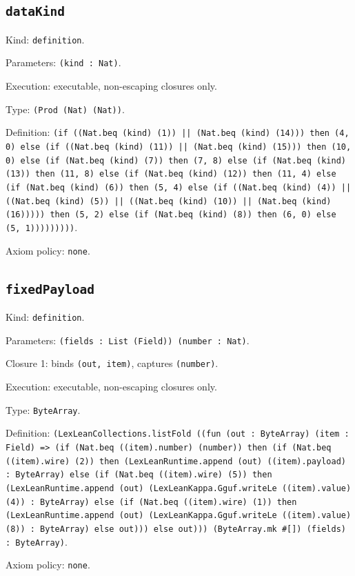 \documentclass[11pt]{article}
\begin{document}
\subsection*{\texttt{dataKind}}
\noindent Kind: \texttt{definition}.\par
\noindent Parameters: \texttt{(kind : Nat)}.\par
\noindent Execution: executable, non-escaping closures only.\par
\noindent Type: \texttt{(Prod (Nat) (Nat))}.\par
\noindent Definition: \texttt{(if ((Nat.beq (kind) (1)) || (Nat.beq (kind) (14))) then (4, 0) else (if ((Nat.beq (kind) (11)) || (Nat.beq (kind) (15))) then (10, 0) else (if (Nat.beq (kind) (7)) then (7, 8) else (if (Nat.beq (kind) (13)) then (11, 8) else (if (Nat.beq (kind) (12)) then (11, 4) else (if (Nat.beq (kind) (6)) then (5, 4) else (if ((Nat.beq (kind) (4)) || ((Nat.beq (kind) (5)) || ((Nat.beq (kind) (10)) || (Nat.beq (kind) (16))))) then (5, 2) else (if (Nat.beq (kind) (8)) then (6, 0) else (5, 1)))))))))}.\par
\noindent Axiom policy: \texttt{none}.\par
\subsection*{\texttt{fixedPayload}}
\noindent Kind: \texttt{definition}.\par
\noindent Parameters: \texttt{(fields : List (Field)) (number : Nat)}.\par
\noindent Closure 1: binds \texttt{(out, item)}, captures \texttt{(number)}.\par
\noindent Execution: executable, non-escaping closures only.\par
\noindent Type: \texttt{ByteArray}.\par
\noindent Definition: \texttt{(LexLeanCollections.listFold ((fun (out : ByteArray) (item : Field) => (if (Nat.beq ((item).number) (number)) then (if (Nat.beq ((item).wire) (2)) then (LexLeanRuntime.append (out) ((item).payload) : ByteArray) else (if (Nat.beq ((item).wire) (5)) then (LexLeanRuntime.append (out) (LexLeanKappa.Gguf.writeLe ((item).value) (4)) : ByteArray) else (if (Nat.beq ((item).wire) (1)) then (LexLeanRuntime.append (out) (LexLeanKappa.Gguf.writeLe ((item).value) (8)) : ByteArray) else out))) else out))) (ByteArray.mk \#[]) (fields) : ByteArray)}.\par
\noindent Axiom policy: \texttt{none}.\par
\end{document}
